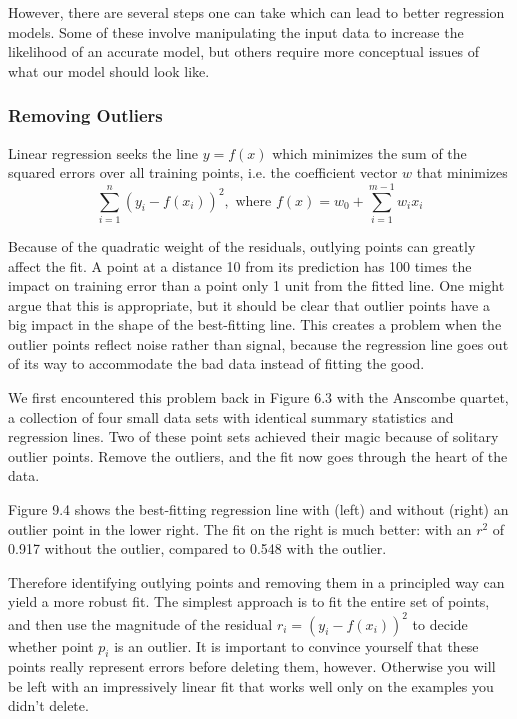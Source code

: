 \documentclass[10pt]{article}
\begin{document}
However, there are several steps one can take which can lead to better regression models. Some of these involve manipulating the input data to increase the likelihood of an accurate model, but others require more conceptual issues of what our model should look like.

\subsubsection{Removing Outliers}
Linear regression seeks the line $y=f(x)$ which minimizes the sum of the squared errors over all training points, i.e. the coefficient vector $w$ that minimizes
\[
\sum_{i=1}^{n}\left(y_{i}-f\left(x_{i}\right)\right)^{2}, \text{ where } f(x)=w_{0}+\sum_{i=1}^{m-1} w_{i} x_{i}
\]

Because of the quadratic weight of the residuals, outlying points can greatly affect the fit. A point at a distance 10 from its prediction has 100 times the impact on training error than a point only 1 unit from the fitted line. One might argue that this is appropriate, but it should be clear that outlier points have a big impact in the shape of the best-fitting line. This creates a problem when the outlier points reflect noise rather than signal, because the regression line goes out of its way to accommodate the bad data instead of fitting the good.

We first encountered this problem back in Figure 6.3 with the Anscombe quartet, a collection of four small data sets with identical summary statistics and regression lines. Two of these point sets achieved their magic because of solitary outlier points. Remove the outliers, and the fit now goes through the heart of the data.

Figure 9.4 shows the best-fitting regression line with (left) and without (right) an outlier point in the lower right. The fit on the right is much better: with an $r^{2}$ of 0.917 without the outlier, compared to 0.548 with the outlier.

Therefore identifying outlying points and removing them in a principled way can yield a more robust fit. The simplest approach is to fit the entire set of points, and then use the magnitude of the residual $r_{i}=\left(y_{i}-f\left(x_{i}\right)\right)^{2}$ to decide whether point $p_{i}$ is an outlier. It is important to convince yourself that these points really represent errors before deleting them, however. Otherwise you will be left with an impressively linear fit that works well only on the examples you didn't delete.
\end{document}
